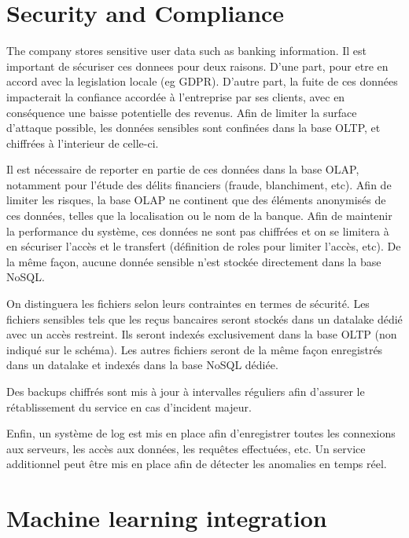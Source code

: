 \documentclass[11pt,a4paper,computermodern]{article}
\begin{document}
\section*{Security and Compliance}

The company stores sensitive user data such as banking information. Il est important de sécuriser ces donnees pour deux raisons. D'une part, pour etre en accord avec la legislation locale (eg GDPR). D'autre part, la fuite de ces données impacterait la confiance accordée à l'entreprise par ses clients, avec en conséquence une baisse potentielle des revenus. Afin de limiter la surface d'attaque possible, les données sensibles sont confinées dans la base OLTP, et chiffrées à l'interieur de celle-ci.

Il est nécessaire de reporter en partie de ces données dans la base OLAP, notamment pour l'étude des délits financiers (fraude, blanchiment, etc). Afin de limiter les risques, la base OLAP ne continent que des éléments anonymisés de ces données, telles que la localisation ou le nom de la banque. Afin de maintenir la performance du système, ces données ne sont pas chiffrées et on se limitera à en sécuriser l'accès et le transfert (définition de roles pour limiter l'accès, etc). De la même façon, aucune donnée sensible n'est stockée directement dans la base NoSQL.

On distinguera les fichiers selon leurs contraintes en termes de sécurité. Les fichiers sensibles tels que les reçus bancaires seront stockés dans un datalake dédié avec un accès restreint. Ils seront indexés exclusivement dans la base OLTP (non indiqué sur le schéma). Les autres fichiers seront de la même façon enregistrés dans un datalake et indexés dans la base NoSQL dédiée.

Des backups chiffrés sont mis à jour à intervalles réguliers afin d'assurer le rétablissement du service en cas d'incident majeur.

Enfin, un système de log est mis en place afin d'enregistrer toutes les connexions aux serveurs, les accès aux données, les requêtes effectuées, etc. Un service additionnel peut être mis en place afin de détecter les anomalies en temps réel.


\section*{Machine learning integration}
\end{document}
